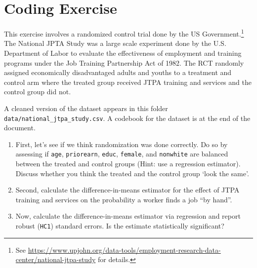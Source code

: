 \documentclass[12pt]{article}
\begin{document}
\section*{Coding Exercise}

This exercise involves a randomized control trial done by the US Government.\footnote{See \url{https://www.upjohn.org/data-tools/employment-research-data-center/national-jtpa-study} for details.} 
The National JPTA Study was a large scale experiment done by the U.S. Department of Labor to evaluate the effectiveness of employment and training programs under the Job Training Partnership Act of 1982. 
The RCT randomly assigned economically disadvantaged adults and youths to a treatment and control arm where the treated group received JTPA training and services and the control group did not.

A cleaned version of the dataset appears in this folder \texttt{data/national\_jtpa\_study.csv}. 
A codebook for the dataset is at the end of the document.

\begin{enumerate}
  \item First, let's see if we think randomization was done correctly. 
  Do so by assessing if \texttt{age}, \texttt{priorearn}, \texttt{educ}, \texttt{female}, and \texttt{nonwhite} are balanced between the treated and control groups (Hint: use a regression estimator). 
  Discuss whether you think the treated and the control group `look the same'.

  \item Second, calculate the difference-in-means estimator for the effect of JTPA training and services on the probability a worker finds a job ``by hand''.
  
  \item Now, calculate the difference-in-means estimator via regression and report robust (\texttt{HC1}) standard errors. Is the estimate statistically significant?
\end{enumerate}


\bigskip
\end{document}
